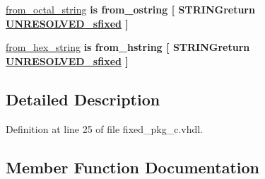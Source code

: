 \begin{DoxyCompactItemize}
\item 
\hyperlink{classfixed__pkg_ad03780406d82a1039546103c01b05ab0}{from\+\_\+octal\+\_\+string}  {\bfseries {\bfseries \textcolor{keywordflow}{is}\textcolor{vhdlchar}{ }\textcolor{vhdlchar}{from\+\_\+ostring}\textcolor{vhdlchar}{ }\textcolor{vhdlchar}{\mbox{[}}\textcolor{vhdlchar}{ }\textcolor{vhdlchar}{S\+T\+R\+I\+N\+Greturn}\textcolor{vhdlchar}{ }{\bfseries \hyperlink{classfixed__pkg_aa723b28a027c3c0f9bca02d75e8df4d6}{U\+N\+R\+E\+S\+O\+L\+V\+E\+D\+\_\+sfixed}} \textcolor{vhdlchar}{ }\textcolor{vhdlchar}{\mbox{]}}\textcolor{vhdlchar}{ }}} {\bfseries \textcolor{vhdlchar}{ }} 
\item 
\hyperlink{classfixed__pkg_a77fc6c4053e07d7a80d3450a6d2b06d6}{from\+\_\+hex\+\_\+string}  {\bfseries {\bfseries \textcolor{keywordflow}{is}\textcolor{vhdlchar}{ }\textcolor{vhdlchar}{from\+\_\+hstring}\textcolor{vhdlchar}{ }\textcolor{vhdlchar}{\mbox{[}}\textcolor{vhdlchar}{ }\textcolor{vhdlchar}{S\+T\+R\+I\+N\+Greturn}\textcolor{vhdlchar}{ }{\bfseries \hyperlink{classfixed__pkg_aa723b28a027c3c0f9bca02d75e8df4d6}{U\+N\+R\+E\+S\+O\+L\+V\+E\+D\+\_\+sfixed}} \textcolor{vhdlchar}{ }\textcolor{vhdlchar}{\mbox{]}}\textcolor{vhdlchar}{ }}} {\bfseries \textcolor{vhdlchar}{ }} 
\end{DoxyCompactItemize}


\subsection{Detailed Description}


Definition at line 25 of file fixed\+\_\+pkg\+\_\+c.\+vhdl.



\subsection{Member Function Documentation}
\hypertarget{classfixed__pkg_a29826fcafea88257a94a5fcc9ededcba}{}
